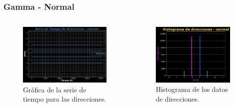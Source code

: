 \begin{frame}
	\frametitle{Gamma - Normal}
	
	\begin{columns}
		
		\begin{column}{0.5\textwidth} %
			\begin{figure}
				\centering
				\includegraphics[width=\textwidth]{graf_direcciones_normal} %
				\caption{Gráfica de la serie de tiempo para las direcciones.}
			\end{figure}
		\end{column}
		
		\begin{column}{0.5\textwidth} %
			\begin{figure}
				\centering
				\includegraphics[width=\textwidth]{hist_direcciones_normal} %
				\caption{Histograma de los datos de direcciones.}
			\end{figure}
		\end{column}
	\end{columns}
\end{frame}


